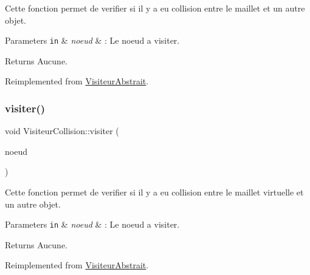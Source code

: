 Cette fonction permet de verifier si il y a eu collision entre le maillet et un autre objet.


\begin{DoxyParams}[1]{Parameters}
\mbox{\tt in}  & {\em noeud} & \+: Le noeud a visiter.\\
\hline
\end{DoxyParams}
\begin{DoxyReturn}{Returns}
Aucune. 
\end{DoxyReturn}


Reimplemented from \hyperlink{class_visiteur_abstrait}{Visiteur\+Abstrait}.

\hypertarget{class_visiteur_collision_a598b2bec9120bdc329721c94bb89b2b1}{}\label{class_visiteur_collision_a598b2bec9120bdc329721c94bb89b2b1} 
\subsubsection{\texorpdfstring{visiter()}{visiter()}\hspace{0.1cm}{\footnotesize\ttfamily [3/8]}}
{\footnotesize\ttfamily void Visiteur\+Collision\+::visiter (\begin{DoxyParamCaption}\item[{\hyperlink{class_noeud_maillet_virtuel}{Noeud\+Maillet\+Virtuel} $\ast$}]{noeud }\end{DoxyParamCaption})\hspace{0.3cm}{\ttfamily [virtual]}}

Cette fonction permet de verifier si il y a eu collision entre le maillet virtuelle et un autre objet.


\begin{DoxyParams}[1]{Parameters}
\mbox{\tt in}  & {\em noeud} & \+: Le noeud a visiter.\\
\hline
\end{DoxyParams}
\begin{DoxyReturn}{Returns}
Aucune. 
\end{DoxyReturn}


Reimplemented from \hyperlink{class_visiteur_abstrait}{Visiteur\+Abstrait}.

\hypertarget{class_visiteur_collision_a9a87666874976c2354ae6008c5d295ed}{}\label{class_visiteur_collision_a9a87666874976c2354ae6008c5d295ed} 

